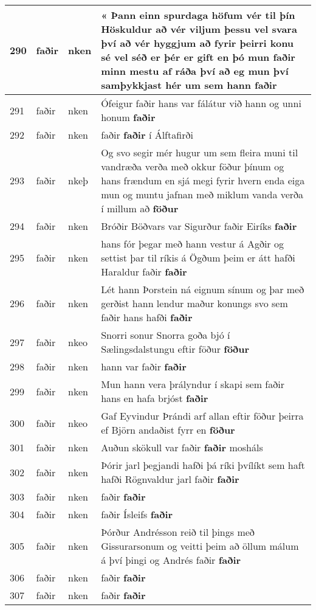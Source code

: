 \documentclass{article}
\begin{document}
\begin{longtable}{p{1cm}|p{1cm}|p{1cm}|p{13cm}}
\hline
290&faðir&nken&« Þann einn spurdaga höfum vér til þín Höskuldur að vér viljum þessu vel svara því að vér hyggjum að fyrir þeirri konu sé vel séð er þér er gift en þó mun faðir minn mestu af ráða því að eg mun því samþykkjast hér um sem hann \textbf{faðir} \\
\hline
291&faðir&nken&Ófeigur faðir hans var fálátur við hann og unni honum \textbf{faðir} \\
\hline
292&faðir&nken&faðir \textbf{faðir} í Álftafirði\\
\hline
293&faðir&nkeþ&Og svo segir mér hugur um sem fleira muni til vandræða verða með okkur föður þínum og hans frændum en sjá megi fyrir hvern enda eiga mun og muntu jafnan með miklum vanda verða í millum að \textbf{föður} \\
\hline
294&faðir&nken&Bróðir Böðvars var Sigurður faðir Eiríks \textbf{faðir} \\
\hline
295&faðir&nken&hans fór þegar með hann vestur á Agðir og settist þar til ríkis á Ögðum þeim er átt hafði Haraldur faðir \textbf{faðir} \\
\hline
296&faðir&nken&Lét hann Þorstein ná eignum sínum og þar með gerðist hann lendur maður konungs svo sem faðir hans hafði \textbf{faðir} \\
\hline
297&faðir&nkeo&Snorri sonur Snorra goða bjó í Sælingsdalstungu eftir föður \textbf{föður} \\
\hline
298&faðir&nken&hann var faðir \textbf{faðir} \\
\hline
299&faðir&nken&Mun hann vera þrályndur í skapi sem faðir hans en hafa brjóst \textbf{faðir} \\
\hline
300&faðir&nkeo&Gaf Eyvindur Þrándi arf allan eftir föður þeirra ef Björn andaðist fyrr en \textbf{föður} \\
\hline
301&faðir&nken&Auðun skökull var faðir \textbf{faðir} mosháls\\
\hline
302&faðir&nken&Þórir jarl þegjandi hafði þá ríki þvílíkt sem haft hafði Rögnvaldur jarl faðir \textbf{faðir} \\
\hline
303&faðir&nken&faðir \textbf{faðir} \\
\hline
304&faðir&nken&faðir Ísleifs \textbf{faðir} \\
\hline
305&faðir&nken&Þórður Andrésson reið til þings með Gissurarsonum og veitti þeim að öllum málum á því þingi og Andrés faðir \textbf{faðir} \\
\hline
306&faðir&nken&faðir \textbf{faðir} \\
\hline
307&faðir&nken&faðir \textbf{faðir} \\

\end{longtable}
\end{document}
